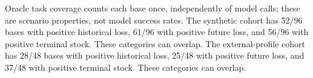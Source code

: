 Oracle task coverage counts each base once, independently of model calls; these are scenario properties, not model success rates.
The synthetic cohort has 52/96 bases with positive historical loss, 61/96 with positive future loss, and 56/96 with positive terminal stock. These categories can overlap.
The external-profile cohort has 28/48 bases with positive historical loss, 25/48 with positive future loss, and 37/48 with positive terminal stock. These categories can overlap.
